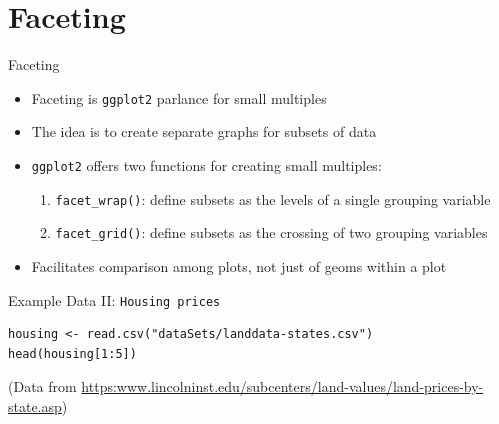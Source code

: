 \documentclass[table,smaller]{beamer}
\begin{document}
\section{Faceting}
\label{sec-5}

\begin{frame}[fragile,label=sec-5-1]{Faceting}
 \begin{itemize}
\item Faceting is \texttt{ggplot2} parlance for \alert{small multiples}
\item The idea is to create separate graphs for subsets of data
\item \texttt{ggplot2} offers two functions for creating small multiples:
\begin{enumerate}
\item \texttt{facet\_wrap()}: define subsets as the levels of a single grouping variable
\item \texttt{facet\_grid()}: define subsets as the crossing of two grouping variables
\end{enumerate}
\item Facilitates comparison among plots, not just of geoms within a plot
\end{itemize}
\end{frame}

\begin{frame}[fragile,label=sec-5-2]{Example Data II: \texttt{Housing prices}}
 \begin{verbatim}
housing <- read.csv("dataSets/landdata-states.csv")
head(housing[1:5])
\end{verbatim}

(Data from \url{https:www.lincolninst.edu/subcenters/land-values/land-prices-by-state.asp})
\end{frame}
\end{document}
